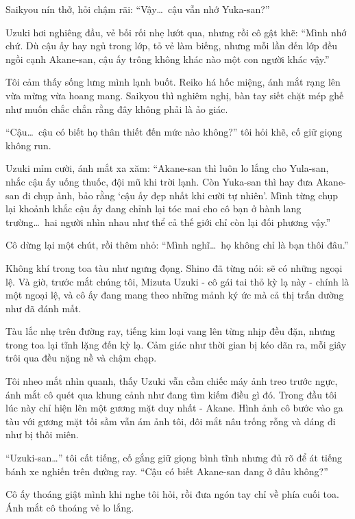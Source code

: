 \documentclass[../main.tex]{subfiles}
\begin{document}
Saikyou nín thở, hỏi chậm rãi: ``Vậy\dots\ cậu vẫn nhớ Yuka-san?''

Uzuki hơi nghiêng đầu, vẻ bối rối nhẹ lướt qua, nhưng rồi cô gật khẽ:
``Mình nhớ chứ. Dù cậu ấy hay ngủ trong lớp, tỏ vẻ làm biếng, nhưng mỗi lần đến lớp đều ngồi cạnh Akane-san, cậu ấy trông không khác nào một con người khác vậy.''

Tôi cảm thấy sống lưng mình lạnh buốt. Reiko há hốc miệng, ánh mắt rạng lên vừa mừng vừa hoang mang. Saikyou thì nghiêm nghị, bàn tay siết chặt mép ghế như muốn chắc chắn rằng đây không phải là ảo giác.

``Cậu\dots\ cậu có biết họ thân thiết đến mức nào không?'' tôi hỏi khẽ, cố giữ giọng không run.

Uzuki mỉm cười, ánh mắt xa xăm:
``Akane-san thì luôn lo lắng cho Yula-san, nhắc cậu ấy uống thuốc, đội mũ khi trời lạnh. Còn Yuka-san thì hay đưa Akane-san đi chụp ảnh, bảo rằng `cậu ấy đẹp nhất khi cười tự nhiên'. Mình từng chụp lại khoảnh khắc cậu ấy đang chỉnh lại tóc mai cho cô bạn ở hành lang trường\dots\ hai người nhìn nhau như thể cả thế giới chỉ còn lại đối phương vậy.''

Cô dừng lại một chút, rồi thêm nhỏ:
``Mình nghĩ\dots\ họ không chỉ là bạn thôi đâu.''

Không khí trong toa tàu như ngưng đọng. Shino đã từng nói: sẽ có những ngoại lệ. Và giờ, trước mắt chúng tôi, Mizuta Uzuki - cô gái tai thỏ kỳ lạ này - chính là một ngoại lệ, và cô ấy đang mang theo những mảnh ký ức mà cả thị trấn dường như đã đánh mất.

\ct

Tàu lắc nhẹ trên đường ray, tiếng kim loại vang lên từng nhịp đều đặn, nhưng trong toa lại tĩnh lặng đến kỳ lạ. Cảm giác như thời gian bị kéo dãn ra, mỗi giây trôi qua đều nặng nề và chậm chạp.

Tôi nheo mắt nhìn quanh, thấy Uzuki vẫn cầm chiếc máy ảnh treo trước ngực, ánh mắt cô quét qua khung cảnh như đang tìm kiếm điều gì đó. Trong đầu tôi lúc này chỉ hiện lên một gương mặt duy nhất - Akane. Hình ảnh cô bước vào ga tàu với gương mặt tối sầm vẫn ám ảnh tôi, đôi mắt nâu trống rỗng và dáng đi như bị thôi miên.

``Uzuki-san\dots'' tôi cất tiếng, cố gắng giữ giọng bình tĩnh nhưng đủ rõ để át tiếng bánh xe nghiến trên đường ray. ``Cậu có biết Akane-san đang ở đâu không?''

Cô ấy thoáng giật mình khi nghe tôi hỏi, rồi đưa ngón tay chỉ về phía cuối toa. Ánh mắt cô thoáng vẻ lo lắng.
\end{document}
